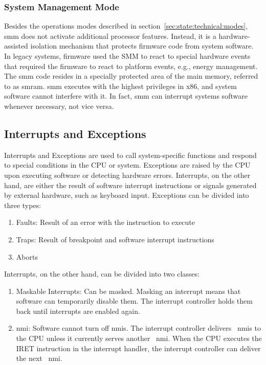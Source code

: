 \subsubsection{System Management Mode}
\label{sec:state:technical:smm}
Besides the operations modes described in
section~\ref{sec:state:technical:modes}, \gls{smm} does not activate additional
processor features. Instead, it is a hardware-assisted isolation
mechanism that protects firmware code from system software. In legacy systems,
firmware used the SMM to react to special hardware events that required the
firmware to react to platform events, e.g., energy management. The \gls{smm} code
resides in a specially protected area of the main memory, referred to as
\gls{smram}. \gls{smm} executes with the highest privileges in x86, and system
software cannot interfere with it. In fact, \gls{smm} can interrupt
systems software whenever necessary, not vice versa.

\subsection{Interrupts and Exceptions}
\label{sec:state:technical:interrupts}
Interrupts and Exceptions are used to call system-specific functions and respond
to special conditions in the CPU or system. Exceptions are raised by the CPU
upon executing software or detecting hardware errors. Interrupts, on the other
hand, are either the result of software interrupt instructions or signals
generated by external hardware, such as keyboard input. Exceptions can be
divided into three types:
\begin{enumerate}
    \item Faults: Result of an error with the instruction to execute
    \item Traps: Result of breakpoint and software interrupt instructions
    \item Aborts
\end{enumerate}
Interrupts, on the other hand, can be divided into two classes:
\begin{enumerate}
    \item Maskable Interrupts: Can be masked. Masking an interrupt means that
          software can temporarily disable them. The interrupt controller holds
          them back until interrupts are enabled again.
    \item \Gls{nmi}: Software cannot turn off
          \glspl{nmi}. The interrupt controller delivers~
          \glspl{nmi} to the CPU unless it currently serves another~
          \gls{nmi}. When the CPU executes the IRET instruction in the
          interrupt handler, the interrupt controller can deliver the next~
          \gls{nmi}.
\end{enumerate}

